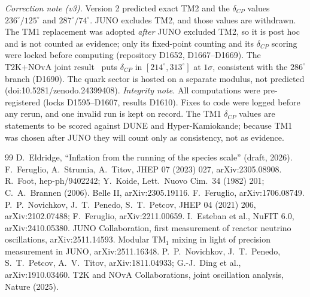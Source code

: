 \documentclass[aps,prd,twocolumn,superscriptaddress,nofootinbib,showkeys]{revtex4-2}
\begin{document}
\emph{Correction note (v3).} Version 2 predicted exact TM2 and the $\delta_{CP}$ values $236^\circ/125^\circ$ and $287^\circ/74^\circ$. JUNO excludes TM2, and those values are withdrawn. The TM1 replacement was adopted \emph{after} JUNO excluded TM2, so it is post hoc and is not counted as evidence; only its fixed-point counting and its $\delta_{CP}$ scoring were locked before computing (repository D1652, D1667--D1669). The T2K+NOvA joint result~\cite{T2KNOVA} puts $\delta_{CP}$ in $[214^\circ,313^\circ]$ at $1\sigma$, consistent with the $286^\circ$ branch (D1690). The quark sector is hosted on a separate modulus, not predicted (doi:10.5281/zenodo.24399408). \emph{Integrity note.} All computations were pre-registered (locks D1595--D1607, results D1610). Fixes to code were logged before any rerun, and one invalid run is kept on record. The TM1 $\delta_{CP}$ values are statements to be scored against DUNE and Hyper-Kamiokande; because TM1 was chosen after JUNO they will count only as consistency, not as evidence.

\begin{thebibliography}{99}
 D.~Eldridge, ``Inflation from the running of the species scale'' (draft, 2026).
 F.~Feruglio, A.~Strumia, A.~Titov, JHEP 07 (2023) 027, arXiv:2305.08908.
 R.~Foot, hep-ph/9402242; Y.~Koide, Lett.~Nuovo Cim.~34 (1982) 201; C.~A.~Brannen (2006).
 Belle II, arXiv:2305.19116.
 F.~Feruglio, arXiv:1706.08749.
 P.~P.~Novichkov, J.~T.~Penedo, S.~T.~Petcov, JHEP 04 (2021) 206, arXiv:2102.07488; F.~Feruglio, arXiv:2211.00659.
 I.~Esteban et al., NuFIT 6.0, arXiv:2410.05380.
 JUNO Collaboration, first measurement of reactor neutrino oscillations, arXiv:2511.14593.
 Modular TM$_1$ mixing in light of precision measurement in JUNO, arXiv:2511.16348.
 P.~P.~Novichkov, J.~T.~Penedo, S.~T.~Petcov, A.~V.~Titov, arXiv:1811.04933; G.-J.~Ding et al., arXiv:1910.03460.
 T2K and NOvA Collaborations, joint oscillation analysis, Nature (2025).
\end{thebibliography}
\end{document}
